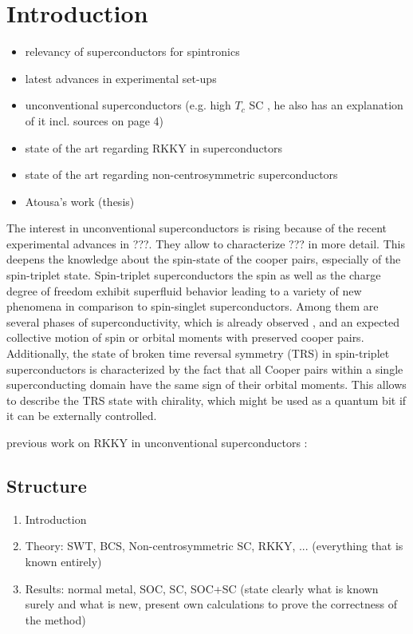 \section{Introduction}
\begin{itemize}
    \item relevancy of superconductors for spintronics
    \item latest advances in experimental set-ups
    \item unconventional superconductors (e.g. high $T_c$ SC \cite{balatsky2006impurity}, he also has an explanation of it incl. sources on page 4)
    \item state of the art regarding RKKY in superconductors
    \item state of the art regarding non-centrosymmetric superconductors
    \item Atousa's work (thesis)
\end{itemize}

The interest in unconventional superconductors is rising because of the recent experimental advances in ???.
They allow to characterize ??? in more detail.
This deepens the knowledge about the spin-state of the cooper pairs, especially of the spin-triplet state.
Spin-triplet superconductors the spin as well as the charge degree of freedom exhibit superfluid behavior leading to a variety of new phenomena in comparison to spin-singlet superconductors.
Among them are several phases of superconductivity, which is already observed \cite{mackenzie2003superconductivity}, and an expected collective motion of spin or orbital moments with preserved cooper pairs.
Additionally, the state of broken time reversal symmetry (TRS) in spin-triplet superconductors is characterized by the fact that all Cooper pairs within a single superconducting domain have the same sign of their orbital moments.
This allows to describe the TRS state with chirality, which might be used as a quantum bit if it can be externally controlled.

previous work on RKKY in unconventional superconductors \cite{aristov_dn_rkky_nodate}: \newline

\subsection{Structure}
\begin{enumerate}
    \item Introduction
    \item Theory: SWT, BCS, Non-centrosymmetric SC, RKKY, ... (everything that is known entirely)
    \item Results: normal metal, SOC, SC, SOC+SC (state clearly what is known surely and what is new, present own calculations to prove the correctness of the method)
\end{enumerate}